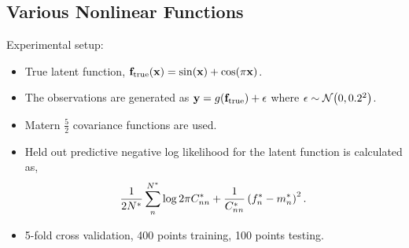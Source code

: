 \documentclass{article} %
\begin{document}
\subsection{Various Nonlinear Functions}
\label{sec:exptoy}

Experimental setup:
\begin{itemize}

    \item True latent function, $\mathbf{f}_{\text{true}}\!\left({\mathbf{x}}\right) =
        \sin\!\left({\mathbf{x}}\right) + \cos\!\left({\pi\mathbf{x}}\right)$.

    \item The observations are generated as $\mathbf{y} =
        g\!\left({{\mathbf{f}_\text{true}}}\right) + \epsilon$ where $\epsilon \sim \mathcal{N}\!\left({0,
            0.2^2}\right)$.
    
    \item Matern $\frac{5}{2}$ covariance functions are used. 

    \item Held out predictive negative log likelihood for the latent function
        is calculated as,
        \begin{equation}
            \frac{1}{2N^{*}} \sum^{N^{*}}_n \log{2\pi\ensuremath{C}\ensuremath{^{*}}_{nn}}
                + \frac{1}{C^{*}_{nn}} \left({f^{*}_n -
                    m^{*}_n}\right)^2.
        \end{equation}

    \item 5-fold cross validation, 400 points training, 100 points testing.

\end{itemize}
\end{document}
